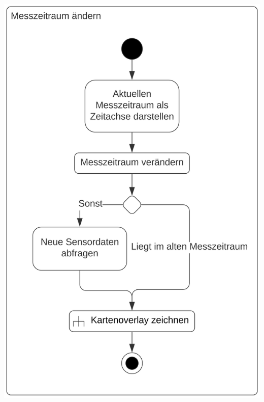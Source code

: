 \begin{center}
\includegraphics[scale=0.19]{media/activity-usage/MesszeitraumAendern} 

\clearpage


\end{center}
